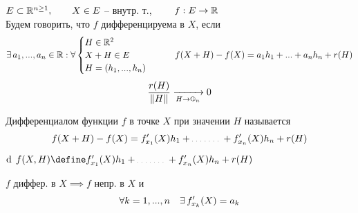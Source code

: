 \begin{definition}
    $ E \subset \mathbb{R}^{n \ge 1}, \qquad X \in E $ -- внутр. т., $ \qquad f : E \to \mathbb{R} $ \\
    Будем говорить, что $ f $ дифференцируема в $ X $, если
    $$ \exists\, a_1, ..., a_n \in \mathbb{R} : \forall
    \begin{cases}
    	H \in \mathbb{R}^2 \\
        X + H \in E \\
        H = (h_1, ..., h_n)
    \end{cases} \qquad f(X + H) - f(X) = a_1h_1 + ... + a_nh_n + r(H) $$
    $$ \frac{r(H)}{\left\|{H}\right\|} \xrightarrow[H \to \mathbb{O}_{n}]{} 0 $$
\end{definition}

\begin{definition}
	Дифференциалом функции $ f $ в точке $ X $ при значении $ H $ называется
    $$ f(X + H) - f(X) = f_{x_1}'(X)h_1 + \widedots[3em] + f_{x_n}'(X)h_n + r(H) $$
\end{definition}

\begin{notation}
    $ \di f(X, H) \define f_{x_1}'(X)h_1 + \widedots[3em] + f_{x_n}'(X)h_n + r(H) $
\end{notation}

\begin{theorem}
	$ f $ диффер. в $ X \implies f $ непр. в $ X $ и
    $$ \forall k = 1, ..., n \quad \exists\, f_{x_k}'(X) = a_k $$
\end{theorem}


